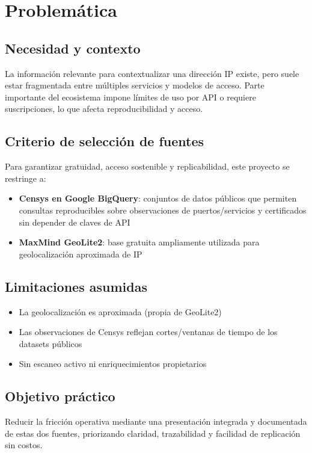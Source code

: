 \section{Problemática}

\subsection{Necesidad y contexto}

La información relevante para contextualizar una dirección IP existe, pero suele estar fragmentada entre múltiples servicios y modelos de acceso. Parte importante del ecosistema impone límites de uso por API o requiere suscripciones, lo que afecta reproducibilidad y acceso.

\subsection{Criterio de selección de fuentes}

Para garantizar gratuidad, acceso sostenible y replicabilidad, este proyecto se restringe a:

\begin{itemize}
\item \textbf{Censys en Google BigQuery}: conjuntos de datos públicos que permiten consultas reproducibles sobre observaciones de puertos/servicios y certificados sin depender de claves de API
\item \textbf{MaxMind GeoLite2}: base gratuita ampliamente utilizada para geolocalización aproximada de IP
\end{itemize}

\subsection{Limitaciones asumidas}

\begin{itemize}
\item La geolocalización es aproximada (propia de GeoLite2)
\item Las observaciones de Censys reflejan cortes/ventanas de tiempo de los datasets públicos
\item Sin escaneo activo ni enriquecimientos propietarios
\end{itemize}

\subsection{Objetivo práctico}

Reducir la fricción operativa mediante una presentación integrada y documentada de estas dos fuentes, priorizando claridad, trazabilidad y facilidad de replicación sin costos.
